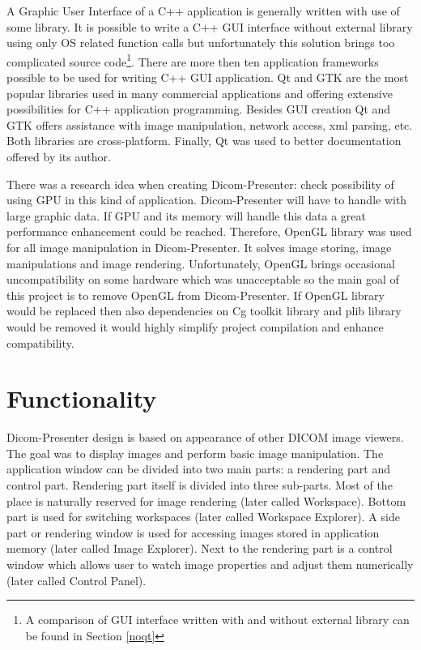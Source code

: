 A Graphic User Interface of a C++ application is generally written with use of some library. It is possible to write a C++ GUI interface without external library using only OS related function calls but unfortunately this solution brings too complicated source code\footnote{A comparison of GUI interface written with and without external library can be found in Section \ref{noqt}}. There are more then ten application frameworks possible to be used for writing C++ GUI application. Qt and GTK are the most popular libraries used in many commercial applications and offering extensive possibilities for C++ application programming\cite{wikipedia}. Besides GUI creation Qt and GTK offers assistance with image manipulation, network access, xml parsing, etc. Both libraries are cross-platform. Finally, Qt was used to better documentation offered by its author.

There was a research idea when creating Dicom-Presenter: check possibility of using GPU in this kind of application. Dicom-Presenter will have to handle with large graphic data. If GPU and its memory will handle this data a great performance enhancement could be reached. Therefore, OpenGL library was used for all image manipulation in Dicom-Presenter. It solves image storing, image manipulations and image rendering. Unfortunately, OpenGL brings 
occasional uncompatibility on some hardware which was unacceptable so the main goal of this project is to remove OpenGL from Dicom-Presenter. If OpenGL library would be replaced then also dependencies on Cg toolkit library and plib library would be removed it would highly simplify project compilation and enhance compatibility.



\section{Functionality}
\label{dicom-presenter}
Dicom-Presenter design is based on appearance of other DICOM image viewers. The goal was to display images and perform basic image manipulation. The application window can be divided into two main parts: a rendering part and control part. Rendering part itself is divided into three sub-parts. Most of the place is naturally reserved for image rendering (later called Workspace). Bottom part is used for switching workspaces (later called Workspace Explorer). A side part or rendering window is used for accessing images stored in application memory (later called Image Explorer). Next to the rendering part is a control window which allows user to watch image  properties and adjust them numerically (later called Control Panel). 

